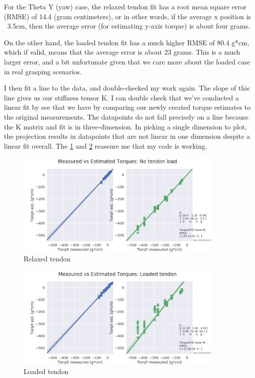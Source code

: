 \documentclass[preprint,12pt,3p]{elsarticle}
\begin{document}
For the Theta Y (yaw) case, the relaxed tendon fit has a root mean square error (RMSE) of 14.4 (gram
centimeters), or in other words, if the average x position is ~3.5cm, then the average error (for
estimating y-axis torque) is about four grams.

On the other hand, the loaded tendon fit has a much higher RMSE of 80.4 g*cm, which if valid, means
that the average error is about 23 grams. This is a much larger error, and a bit unfortunate given
that we care more about the loaded case in real grasping scenarios. 

I then fit a line to the data, and double-checked my work again. The slope of this line gives us our
stiffness tensor K. I can double check that we've conducted a linear fit by see that we have
by comparing our newly created torque estimates to the
original measurements. The datapoints do not fall precisely on a line because the K matrix and fit
is in three-dimension. In picking a single dimension to plot, the projection results in datapoints
that are not linear in one dimension despite a linear fit overall. The \cref{fig:sanity1} and
\cref{fig:sanity2} reassure me that my code is working. 

\begin{figure}[H]
\centering
\includegraphics[width=0.9\textwidth]{images/stiff/torqsanity.png}
\caption{Relaxed tendon}
\label{fig:sanity1}
\end{figure}

\begin{figure}[H]
\centering
\includegraphics[width=0.9\textwidth]{images/stiff/torqsanity_loaded.png}
\caption{Loaded tendon}
\label{fig:sanity2}
\end{figure}
\end{document}
